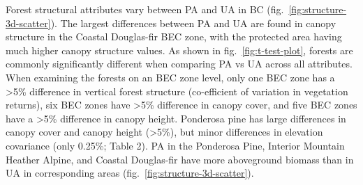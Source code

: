 \documentclass[10pt,oneside]{article}
\begin{document}
Forest structural attributes vary between PA and UA in BC
(fig.~\ref{fig:structure-3d-scatter}). The largest differences between
PA and UA are found in canopy structure in the Coastal Douglas-fir BEC
zone, with the protected area having much higher canopy structure
values. As shown in fig.~\ref{fig:t-test-plot}, forests are commonly
significantly different when comparing PA vs UA across all attributes.
When examining the forests on an BEC zone level, only one BEC zone has a
\textgreater5\% difference in vertical forest structure (co-efficient of
variation in vegetation returns), six BEC zones have \textgreater5\%
difference in canopy cover, and five BEC zones have a \textgreater5\%
difference in canopy height. Ponderosa pine has large differences in
canopy cover and canopy height (\textgreater5\%), but minor differences
in elevation covariance (only 0.25\%; Table 2). PA in the Ponderosa
Pine, Interior Mountain Heather Alpine, and Coastal Douglas-fir have
more aboveground biomass than in UA in corresponding areas
(fig.~\ref{fig:structure-3d-scatter}).
\end{document}
